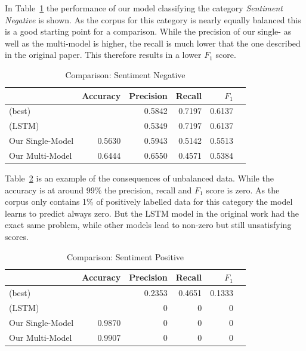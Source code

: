 \documentclass[11pt,a4paper]{article}
\begin{document}
In Table~\ref{tab:results:sentiment_negative} the performance of our model classifying the category \textit{Sentiment Negative} is shown. As the corpus for this category is nearly equally balanced this is a good starting point for a comparison. While the precision of our single- as well as the multi-model is higher, the recall is much lower that the one described in the original paper. This therefore results in a lower $F_1$ score.
\begin{table}[h!]
	\centering\tiny
	\begin{tabular}{l r r r r r}
		& Accuracy & Precision & Recall & $F_1$ \\
		\hline
		\cite{Schabus17} (best) & & 0.5842 & 0.7197 & 0.6137 \\
		\cite{Schabus17} (LSTM) & & 0.5349 & 0.7197 & 0.6137 \\
		\hline
		Our Single-Model & 0.5630 & 0.5943 & 0.5142 & 0.5513\\
		Our Multi-Model & 0.6444 & 0.6550 & 0.4571 & 0.5384 \\
	\end{tabular}  
	\caption{Comparison: Sentiment Negative}
	\label{tab:results:sentiment_negative}
\end{table}

Table~\ref{tab:results:sentiment_positive} is an example of the consequences of unbalanced data. While the accuracy is at around 99\% the precision, recall and $F_1$ score is zero. As the corpus only contains 1\% of positively labelled data for this category the model learns to predict always zero.
But the LSTM model in the original work had the exact same problem, while other models lead to non-zero but still unsatisfying scores.
\begin{table}[h!]
	\centering\tiny
	\begin{tabular}{l r r r r r}
		& Accuracy & Precision & Recall & $F_1$ \\
		\hline
		\cite{Schabus17} (best) & & 0.2353 & 0.4651 & 0.1333 \\
		\cite{Schabus17} (LSTM) & & 0 & 0 & 0\\
		\hline
		Our Single-Model & 0.9870 & 0 & 0 & 0 \\
		Our Multi-Model & 0.9907 & 0 & 0 & 0 \\
	\end{tabular}
	\caption{Comparison: Sentiment Positive}
	\label{tab:results:sentiment_positive}
\end{table}
\end{document}
